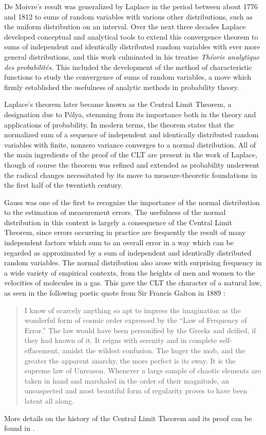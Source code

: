 \documentclass{svjour3}
\begin{document}
De Moivre's result was generalized by Laplace in the period between about 1776 and 1812 to sums of random variables with various other distributions, such as the uniform distribution on an interval. Over the next three decades Laplace developed conceptual and analytical tools to extend this convergence theorem to sums of independent and identically distributed random variables with ever more general distributions, and this work culminated in his treatise {\em Th\'eorie analytique des probabilit\'es}. This included the development of the method of characteristic functions to study the convergence of sums of random variables, a move which firmly established the usefulness of analytic methods in probability theory.

Laplace's theorem later became known as the Central Limit Theorem, a designation due to P\'olya, stemming from its importance both in the theory and applications of probability. In modern terms, the theorem states that the normalized sum of a sequence of independent and identically distributed random variables with finite, nonzero variance converges to a normal distribution. All of the main ingredients of the proof of the CLT are present in the work of Laplace, though of course the theorem was refined and extended as probability underwent the radical changes necessitated by its move to measure-theoretic foundations in the first half of the twentieth century.

Gauss was one of the first to recognize the importance of the normal distribution to the estimation of measurement errors. The usefulness of the normal distribution in this context is largely a consequence of the Central Limit Theorem, since errors occurring in practice are frequently the result of many independent factors which sum to an overall error in a way which can be regarded as approximated by a sum of independent and identically distributed random variables. The normal distribution also arose with surprising frequency in a wide variety of empirical contexts, from the heights of men and women to the velocities of molecules in a gas. This gave the CLT the character of a natural law, as seen in the following poetic quote from Sir Francis Galton in 1889 \cite{galton:89}:
\begin{quote}
 I know of scarcely anything so apt to impress the imagination as the wonderful form of cosmic order expressed by the ``Law of Frequency of Error.'' The law would have been personified by the Greeks and deified, if they had known of it. It reigns with serenity and in complete self-effacement, amidst the wildest confusion. The huger the mob, and the greater the apparent anarchy, the more perfect is its sway. It is the supreme law of Unreason. Whenever a large sample of chaotic elements are taken in hand and marshaled in the order of their magnitude, an unsuspected and most beautiful form of regularity proves to have been latent all along.
\end{quote}
More details on the history of the Central Limit Theorem and its proof can be found in \cite{fischer:11}.
\end{document}
